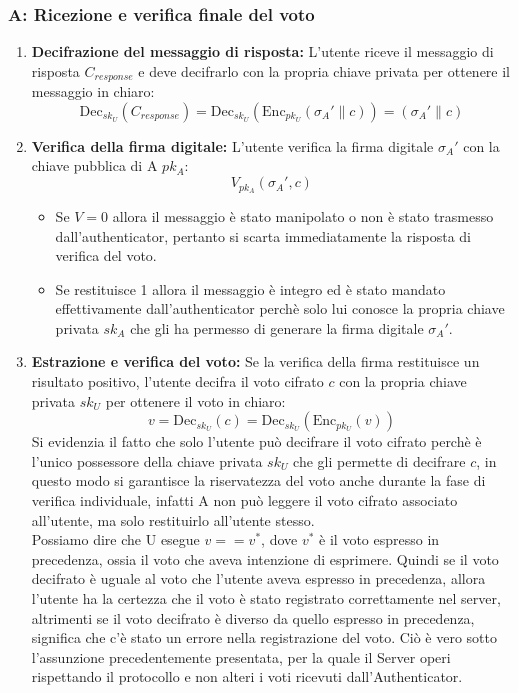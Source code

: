 \subsubsection{A: Ricezione e verifica finale del voto}
\begin{enumerate}
	\item \textbf{Decifrazione del messaggio di risposta:}
	L'utente riceve il messaggio di risposta $C_{response}$ e deve decifrarlo con la propria chiave privata per ottenere il messaggio in chiaro:
	$$ \text{Dec}_{sk_U}(C_{response}) = \text{Dec}_{sk_U}(\text{Enc}_{pk_U}(\sigma_A' \| c)) = \boxed{(\sigma_A' \| c)} $$
	
	\item \textbf{Verifica della firma digitale:}
	L'utente verifica la firma digitale $\sigma_A'$ con la chiave pubblica di A $pk_A$:
	$$ V_{pk_A}(\sigma_A', c) $$
	\begin{itemize}
		\item Se $V=0$ allora il messaggio è stato manipolato o non è stato trasmesso dall'authenticator, pertanto si scarta immediatamente la risposta di verifica del voto.
		
		\item Se restituisce 1 allora il messaggio è integro ed è stato mandato effettivamente dall'authenticator perchè solo lui conosce la propria chiave privata $sk_A$ che gli ha permesso di generare la firma digitale $\sigma_A'$.
	\end{itemize}

	\item \textbf{Estrazione e verifica del voto:}
	Se la verifica della firma restituisce un risultato positivo, l'utente decifra il voto cifrato $c$ con la propria chiave privata $sk_U$ per ottenere il voto in chiaro:
	$$ v = \text{Dec}_{sk_U}(c) = \text{Dec}_{sk_U}(\text{Enc}_{pk_U}(v)) $$
	Si evidenzia il fatto che solo l'utente può decifrare il voto cifrato perchè è l'unico possessore della chiave privata $sk_U$ che gli permette di decifrare $c$, in questo modo si garantisce la riservatezza del voto anche durante la fase di verifica individuale, infatti A non può leggere il voto cifrato associato all'utente, ma solo restituirlo all'utente stesso.\\
	Possiamo dire che U esegue $v == v^*$, dove $v^*$ è il voto espresso in precedenza, ossia il voto che aveva intenzione di esprimere. Quindi se il voto decifrato è uguale al voto che l'utente aveva espresso in precedenza, allora l'utente ha la certezza che il voto è stato registrato correttamente nel server, altrimenti se il voto decifrato è diverso da quello espresso in precedenza, significa che c'è stato un errore nella registrazione del voto. Ciò è vero sotto l'assunzione precedentemente presentata, per la quale il Server operi rispettando il protocollo e non alteri i voti ricevuti dall'Authenticator.
\end{enumerate}


